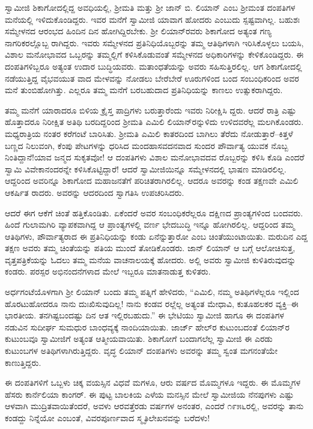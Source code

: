 ಸ್ವಾಮೀಜಿ ಶಿಕಾಗೋದಲ್ಲಿದ್ದ ಅವಧಿಯಲ್ಲಿ, ಶ್ರೀಮತಿ ಮತ್ತು ಶ್ರೀ ಜಾನ್ ಬಿ. ಲಿಯಾನ್ ಎಂಬ ಶ್ರೀಮಂತ ದಂಪತಿಗಳ ಮನೆಯಲ್ಲಿ ಇಳಿದುಕೊಂಡಿದ್ದರು. ಇವರ ಮನೆಗೆ ಸ್ವಾಮೀಜಿ ಯಾವಾಗ ಹೋದರು ಎಂಬುದು ಸ್ಪಷ್ಟವಾಗಿಲ್ಲ. ಬಹುಶಃ ಸಮ್ಮೇಳನದ ಆರಂಭದ ಹಿಂದಿನ ದಿನ ಹೋಗಿದ್ದಿರಬೇಕು. ಶ್ರೀ ಲಿಯಾನ್​ರವರು ಶಿಕಾಗೋದ ಅತ್ಯಂತ ಗಣ್ಯ ನಾಗರಿಕರಲ್ಲೊಬ್ಬ ರಾಗಿದ್ದರು. ಇವರು ಸಮ್ಮೇಳನದ ಪ್ರತಿನಿಧಿಯೊಬ್ಬರನ್ನು ತಮ್ಮ ಆತಿಥಿಗಳಾಗಿ ಇರಿಸಿಕೊಳ್ಳಲು ಬಯಸಿ, ವಿಶಾಲ ಮನೋಭಾವದ ಒಬ್ಬರನ್ನು ತಮ್ಮಲ್ಲಿಗೆ ಕಳಿಸಿಕೊಡುವಂತೆ ಸಮ್ಮೇಳನದ ಅಧಿಕಾರಿಗಳನ್ನು ಕೇಳಿಕೊಂಡಿದ್ದರು. ಈ ದಂಪತಿಗಳಿಬ್ಬರೂ ಅತ್ಯಂತ ಉದಾರ ಬುದ್ಧಿಯವರು. ಮತಾಂಧತೆಯನ್ನು ಅವರು ಸಹಿಸುತ್ತಿರಲಿಲ್ಲ. ಆಗ ಶಿಕಾಗೋದಲ್ಲಿ ನಡೆಯುತ್ತಿದ್ದ ವೈಭವಯುತ ವಾದ ಮೇಳವನ್ನು ನೋಡಲು ಬೇರೆಬೇರೆ ಊರುಗಳಿಂದ ಬಂದ ಸಂಬಂಧಿಕರಿಂದ ಅವರ ಮನೆ ತುಂಬಿಹೋಗಿತ್ತು. ಎಲ್ಲರೂ ತಮ್ಮ ಮನೆಗೆ ಬರಬಹುದಾದ ಪ್ರತಿನಿಧಿಯನ್ನು ಕಾಣಲು ಉತ್ಸುಕರಾಗಿದ್ದರು.

ತಮ್ಮ ಮನೆಗೆ ಯಾರಾದರೂ ಬಿಳಿಯ ಕ್ರೈಸ್ತ ಪಾದ್ರಿಗಳು ಬರುತ್ತಾರೆಂದು ಇವರು ನಿರೀಕ್ಷಿಸಿ ದ್ದರು. ಆದರೆ ರಾತ್ರಿ ಎಷ್ಟು ಹೊತ್ತಾದರೂ ನಿರೀಕ್ಷಿತ ಅತಿಥಿ ಬರದಿದ್ದರಿಂದ ಶ್ರೀಮತಿ ಎಮಿಲಿ ಲಿಯಾನ್​ರನ್ನುಳಿದು ಉಳಿದವರೆಲ್ಲ ಮಲಗಿಕೊಂಡರು. ಮಧ್ಯರಾತ್ರಿಯ ನಂತರ ಕರೆಗಂಟೆ ಬಾರಿಸಿತು. ಶ್ರೀಮತಿ ಎಮಿಲಿ ಕಾತರದಿಂದ ಬಾಗಿಲು ತೆರೆದು ನೋಡುತ್ತಾರೆ–ಕಿತ್ತಳೆ ಬಣ್ಣದ ನಿಲುವಂಗಿ, ಕೆಂಪು ಪೇಟಗಳನ್ನು ಧರಿಸಿದ ಮಂದಹಾಸವದನವಾದ ಸುಂದರ ಪೌರ್ವಾತ್ಯ ಯುವಕ ನೊಬ್ಬ ನಿಂತಿದ್ದಾನೆ!ಯಾವ ಜನ್ಮದ ಸುಕೃತವೋ! ಆ ದಂಪತಿಗಳು ವಿಶಾಲ ಮನೋಭಾವದವ ರೊಬ್ಬರನ್ನು ಕಳಿಸಿ ಕೊಡಿ ಎಂದರೆ ಸ್ವಾಮಿ ವಿವೇಕಾನಂದರನ್ನೇ ಕಳಿಸಿಕೊಟ್ಟಿದ್ದಾರೆ! ಆದರೆ ಸ್ವಾಮೀಜಿಯಿನ್ನೂ ಸಮ್ಮೇಳನದಲ್ಲಿ ಭಾಷಣ ಮಾಡಿರಲಿಲ್ಲ. ಆದ್ದರಿಂದ ಅವರಿನ್ನೂ ಶಿಕಾಗೋದ ಮಹಾಜನತೆಗೆ ಪರಿಚಿತರಾಗಿರಲಿಲ್ಲ. ಆದರೂ ಅವರನ್ನು ಕಂಡ ತಕ್ಷಣವೇ ಎಮಿಲಿ ಆಕರ್ಷಿತ ರಾದರು. ಅವರನ್ನು ಆದರದಿಂದ ಸ್ವಾಗತಿಸಿ ಉಪಚರಿಸಿದರು.

ಆದರೆ ಈಗ ಆಕೆಗೆ ಚಿಂತೆ ಹತ್ತಿಕೊಂಡಿತು. ಏಕೆಂದರೆ ಅವರ ಸಂಬಂಧಿಕರೆಲ್ಲರೂ ದಕ್ಷಿಣದ ಪ್ರಾಂತ್ಯಗಳಿಂದ ಬಂದವರು. ಹಿಂದೆ ಗುಲಾಮಗಿರಿ ವ್ಯಾಪಕವಾಗಿದ್ದ ಆ ಪ್ರಾಂತ್ಯಗಳಲ್ಲಿ ವರ್ಣ ಭೇದಬುದ್ಧಿ ಇನ್ನೂ ಹೋಗಿರಲಿಲ್ಲ. ಆದ್ದರಿಂದ ತಮ್ಮ ಆತಿಥಿಗಳು, ಪೌರ್ವಾತ್ಯರಾದ ಈ ಪ್ರತಿನಿಧಿಯನ್ನು ಕಂಡು ಏನೆನ್ನುತ್ತಾರೋ ಎಂಬ ಚಿಂತೆಯುಂಟಾಯಿತು. ಮರುದಿನ ಎದ್ದ ತಕ್ಷಣ ಅವರು ತಮ್ಮ ಚಿಂತೆಯನ್ನು ಪತಿಯ ಮುಂದೆ ತೋಡಿಕೊಂಡರು. ಜಾನ್ ಲಿಯಾನ್ ಆ ಬಗ್ಗೆ ಆಲೋಚಿಸುತ್ತ, ವೃತ್ತಪತ್ರಿಕೆಯನ್ನು ಓದಲು ತಮ್ಮ ಮನೆಯ ವಾಚನಾಲಯಕ್ಕೆ ಹೋದರು. ಅಲ್ಲಿ ಅವರು ಸ್ವಾಮೀಜಿ ಕುಳಿತಿರುವುದನ್ನು ಕಂಡರು. ಪರಸ್ಪರ ಅಭಿನಂದನೆಗಳಾದ ಮೇಲೆ ಇಬ್ಬರೂ ಮಾತನಾಡುತ್ತ ಕುಳಿತರು.

ಅರ್ಧಗಂಟೆಯೊಳಗಾಗಿ ಶ್ರೀ ಲಿಯಾನ್ ಬಂದು ತಮ್ಮ ಪತ್ನಿಗೆ ಹೇಳಿದರು, “ಎಮಿಲಿ, ನಮ್ಮ ಅತಿಥಿಗಳೆಲ್ಲರೂ ಇಲ್ಲಿಂದ ಹೊರಟುಹೋದರೂ ನಾನು ದುಃಖಿಸುವುದಿಲ್ಲ! ನಾನು ಕಂಡವ ರಲ್ಲೆಲ್ಲ ಅತ್ಯಂತ ಮೇಧಾವಿ, ಕುತೂಹಲಕರ ವ್ಯಕ್ತಿ–ಈ ಭಾರತೀಯ. ತನಗಿಷ್ಟಬಂದಷ್ಟು ದಿನ ಆತ ಇಲ್ಲಿರಬಹುದು.” ಈ ಭೇಟಿಯು ಸ್ವಾಮೀಜಿ ಹಾಗೂ ಈ ದಂಪತಿಗಳ ನಡುವಿನ ಸುದೀರ್ಘ ಸುಮಧುರ ಬಾಂಧವ್ಯಕ್ಕೆ ನಾಂದಿಯಾಯಿತು. ಜಾರ್ಜ್ ಹೇಲ್​ರ ಕುಟುಂಬದಂತೆ ಲಿಯಾನ್​ರ ಕುಟುಂಬವೂ ಸ್ವಾಮೀಜಿಗೆ ಅತ್ಯಂತ ಆತ್ಮೀಯವಾಯಿತು. ಶಿಕಾಗೋಗೆ ಬಂದಾಗಲೆಲ್ಲ ಸ್ವಾಮೀಜಿ ಈ ಎರಡು ಕುಟುಂಬಗಳ ಅತಿಥಿಗಳಾಗಿರುತ್ತಿದ್ದರು. ವೃದ್ಧ ಲಿಯಾನ್ ದಂಪತಿಗಳು ಅವರನ್ನು ತಮ್ಮ ಸ್ವಂತ ಮಗನಂತೆಯೇ ಕಾಣುತ್ತಿದ್ದರು.

ಈ ದಂಪತಿಗಳಿಗೆ ಒಬ್ಬಳು ಚಿಕ್ಕ ವಯಸ್ಸಿನ ವಿಧವೆ ಮಗಳೂ, ಆರು ವರ್ಷದ ಮೊಮ್ಮಗಳೂ ಇದ್ದರು. ಈ ಮೊಮ್ಮಗಳ ಹೆಸರು ಕಾರ್ನೆಲಿಯಾ ಕಾಂಗರ್. ಈ ಪುಟ್ಟ ಬಾಲಕಿಯ ಎಳೆಯ ಮನಸ್ಸಿನ ಮೇಲೆ ಸ್ವಾಮೀಜಿಯ ನೆನಪುಗಳು ಎಷ್ಟು ಆಳವಾಗಿ ಮುದ್ರಿತವಾಯಿತೆಂದರೆ, ಅವಳು ಆರವತ್ತೆರಡು ವರ್ಷಗಳ ಅನಂತರ, ಎಂದರೆ ೧೯೫೬ರಲ್ಲಿ, ಅವರನ್ನು ತಾನು ಕಂಡದ್ದು ನಿನ್ನೆಯೋ ಎಂಬಂತೆ, ವಿವರಪೂರ್ಣವಾದ ಸ್ಮೃತಿಲೇಖನವನ್ನು ಬರೆದಳು!

